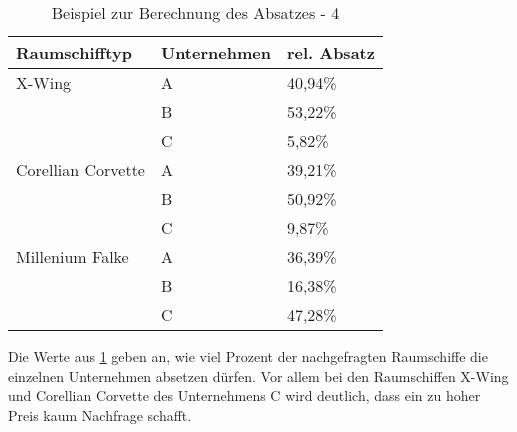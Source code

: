 \begin{table}[htb]
     \centering
     \begin{tabular}{ | l | l | l | }
          \hline
          Raumschifftyp & Unternehmen & rel. Absatz \\
          \hline \hline
          X-Wing & A & 40,94\%  \\
                 & B & 53,22\% \\
                 & C & 5,82\% \\ \hline
          Corellian Corvette & A & 39,21\% \\
                             & B & 50,92\% \\
                             & C & 9,87\% \\ \hline
          Millenium Falke & A & 36,39\% \\
                          & B & 16,38\% \\
                          & C & 47,28\% \\ \hline
     \end{tabular}
     \caption{Beispiel zur Berechnung des Absatzes - 4}
     \label{tab:spielwelt-logik-absatzmengen-beispiel4}
\end{table}

Die Werte aus \ref{tab:spielwelt-logik-absatzmengen-beispiel4} geben an, wie viel Prozent der nachgefragten Raumschiffe die einzelnen
Unternehmen absetzen dürfen. Vor allem bei den Raumschiffen X-Wing und Corellian Corvette des Unternehmens C wird deutlich, dass
ein zu hoher Preis kaum Nachfrage schafft.